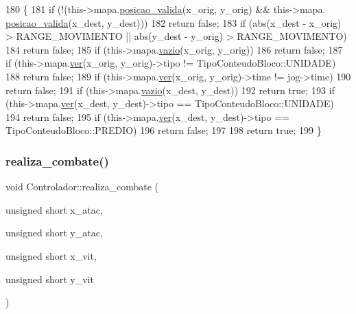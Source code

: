 \begin{DoxyCode}
180                                                                                                            
                                    \{
181     \textcolor{keywordflow}{if} (!(this->mapa.\mbox{\hyperlink{class_mapa_aa07c1444720958b3efbc734d2691361d}{posicao\_valida}}(x\_orig, y\_orig) && this->mapa.
      \mbox{\hyperlink{class_mapa_aa07c1444720958b3efbc734d2691361d}{posicao\_valida}}(x\_dest, y\_dest)))
182         \textcolor{keywordflow}{return} \textcolor{keyword}{false};
183     \textcolor{keywordflow}{if} (abs(x\_dest - x\_orig) > RANGE\_MOVIMENTO || abs(y\_dest - y\_orig) > RANGE\_MOVIMENTO)
184         \textcolor{keywordflow}{return} \textcolor{keyword}{false};
185     \textcolor{keywordflow}{if} (this->mapa.\mbox{\hyperlink{class_mapa_a5bdde997d3c97c5b6fb7d37c124cdf93}{vazio}}(x\_orig, y\_orig))
186         \textcolor{keywordflow}{return} \textcolor{keyword}{false};
187     \textcolor{keywordflow}{if} (this->mapa.\mbox{\hyperlink{class_mapa_a52dbdf40a47afb56b1cb35dd1cb552f5}{ver}}(x\_orig, y\_orig)->tipo != TipoConteudoBloco::UNIDADE)
188         \textcolor{keywordflow}{return} \textcolor{keyword}{false};
189     \textcolor{keywordflow}{if} (this->mapa.\mbox{\hyperlink{class_mapa_a52dbdf40a47afb56b1cb35dd1cb552f5}{ver}}(x\_orig, y\_orig)->time != jog->time)
190         \textcolor{keywordflow}{return} \textcolor{keyword}{false};
191     \textcolor{keywordflow}{if} (this->mapa.\mbox{\hyperlink{class_mapa_a5bdde997d3c97c5b6fb7d37c124cdf93}{vazio}}(x\_dest, y\_dest))
192         \textcolor{keywordflow}{return} \textcolor{keyword}{true};
193     \textcolor{keywordflow}{if} (this->mapa.\mbox{\hyperlink{class_mapa_a52dbdf40a47afb56b1cb35dd1cb552f5}{ver}}(x\_dest, y\_dest)->tipo == TipoConteudoBloco::UNIDADE)
194         \textcolor{keywordflow}{return} \textcolor{keyword}{false};
195     \textcolor{keywordflow}{if} (this->mapa.\mbox{\hyperlink{class_mapa_a52dbdf40a47afb56b1cb35dd1cb552f5}{ver}}(x\_dest, y\_dest)->tipo == TipoConteudoBloco::PREDIO)
196         \textcolor{keywordflow}{return} \textcolor{keyword}{false};
197 
198     \textcolor{keywordflow}{return} \textcolor{keyword}{true};
199 \}
\end{DoxyCode}
\mbox{\label{class_controlador_a3f130df13f0c24605a3e34c3edbd2959}} 
\subsubsection{\texorpdfstring{realiza\+\_\+combate()}{realiza\_combate()}}
{\footnotesize\ttfamily void Controlador\+::realiza\+\_\+combate (\begin{DoxyParamCaption}\item[{unsigned short}]{x\+\_\+atac,  }\item[{unsigned short}]{y\+\_\+atac,  }\item[{unsigned short}]{x\+\_\+vit,  }\item[{unsigned short}]{y\+\_\+vit }\end{DoxyParamCaption})}


